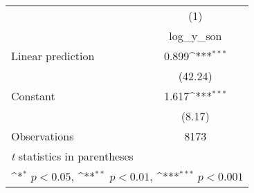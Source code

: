 {
\def\sym#1{\ifmmode^{#1}\else\(^{#1}\)\fi}
\begin{tabular}{l*{1}{c}}
\hline\hline
                    &\multicolumn{1}{c}{(1)}\\
                    &\multicolumn{1}{c}{log\_y\_son}\\
\hline
Linear prediction   &       0.899\sym{***}\\
                    &     (42.24)         \\
[1em]
Constant            &       1.617\sym{***}\\
                    &      (8.17)         \\
\hline
Observations        &        8173         \\
\hline\hline
\multicolumn{2}{l}{\footnotesize \textit{t} statistics in parentheses}\\
\multicolumn{2}{l}{\footnotesize \sym{*} \(p<0.05\), \sym{**} \(p<0.01\), \sym{***} \(p<0.001\)}\\
\end{tabular}
}
